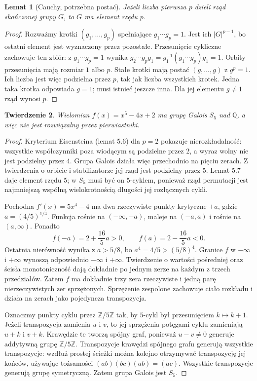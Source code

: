 \documentclass[11pt,a4paper,oneside]{book}
\numberwithin{equation}{section}
\theoremstyle{plain}
\newtheorem{twierdzenie}{Twierdzenie}[chapter]
\newtheorem{lemat}[twierdzenie]{Lemat}
\theoremstyle{definition}
\theoremstyle{remark}
\newcommand{\Q}{\mathbb{Q}}
\newcommand{\Z}{\mathbb{Z}}
\begin{document}
\begin{lemat}[Cauchy, potrzebna postać]
Jeżeli liczba pierwsza $p$ dzieli rząd skończonej grupy $G$, to $G$ ma element rzędu $p$.
\end{lemat}
\begin{proof}
Rozważmy krotki $(g_1,\dots,g_p)$ spełniające $g_1\cdots g_p=1$. Jest ich $|G|^{p-1}$, bo ostatni element jest wyznaczony przez pozostałe. Przesunięcie cykliczne zachowuje ten zbiór: z $g_1\cdots g_p=1$ wynika $g_2\cdots g_pg_1=g_1^{-1}(g_1\cdots g_p)g_1=1$. Orbity przesunięcia mają rozmiar $1$ albo $p$. Stałe krotki mają postać $(g,\dots,g)$ z $g^p=1$. Ich liczba jest więc podzielna przez $p$, tak jak liczba wszystkich krotek. Jedna taka krotka odpowiada $g=1$; musi istnieć jeszcze inna. Dla jej elementu $g\ne1$ rząd wynosi $p$.
\end{proof}

\begin{twierdzenie}
Wielomian $f(x)=x^5-4x+2$ ma grupę Galois $S_5$ nad $\Q$, a więc nie jest rozwiązalny przez pierwiastniki.
\end{twierdzenie}
\begin{proof}
Kryterium Eisensteina (lemat 5.6) dla $p=2$ pokazuje nierozkładalność: wszystkie współczynniki poza wiodącym są podzielne przez $2$, a wyraz wolny nie jest podzielny przez $4$. Grupa Galois działa więc przechodnio na pięciu zerach. Z twierdzenia o orbicie i stabilizatorze jej rząd jest podzielny przez $5$. Lemat 5.7 daje element rzędu $5$; w $S_5$ musi być on $5$-cyklem, ponieważ rząd permutacji jest najmniejszą wspólną wielokrotnością długości jej rozłącznych cykli.

Pochodna $f'(x)=5x^4-4$ ma dwa rzeczywiste punkty krytyczne $\pm a$, gdzie $a=(4/5)^{1/4}$. Funkcja rośnie na $(-\infty,-a)$, maleje na $(-a,a)$ i rośnie na $(a,\infty)$. Ponadto
\[
f(-a)=2+\frac{16}{5}a>0,\qquad
f(a)=2-\frac{16}{5}a<0.
\]
Ostatnia nierówność wynika z $a>5/8$, bo $a^4=4/5>(5/8)^4$. Granice $f$ w $-\infty$ i $+\infty$ wynoszą odpowiednio $-\infty$ i $+\infty$. Twierdzenie o wartości pośredniej oraz ścisła monotoniczność dają dokładnie po jednym zerze na każdym z trzech przedziałów. Zatem $f$ ma dokładnie trzy zera rzeczywiste i jedną parę nierzeczywistych zer sprzężonych. Sprzężenie zespolone zachowuje ciało rozkładu i działa na zerach jako pojedyncza transpozycja.

Oznaczmy punkty cyklu przez $\Z/5\Z$ tak, by $5$-cykl był przesunięciem $k\mapsto k+1$. Jeżeli transpozycja zamienia $u$ i $v$, to jej sprzężenia potęgami cyklu zamieniają $u+k$ i $v+k$. Krawędzie te tworzą spójny graf, ponieważ $u-v\ne0$ generuje addytywną grupę $\Z/5\Z$. Transpozycje krawędzi spójnego grafu generują wszystkie transpozycje: wzdłuż prostej ścieżki można kolejno otrzymywać transpozycję jej końców, używając tożsamości $(ab)(bc)(ab)=(ac)$. Wszystkie transpozycje generują grupę symetryczną. Zatem grupa Galois jest $S_5$.
\end{proof}
\end{document}
